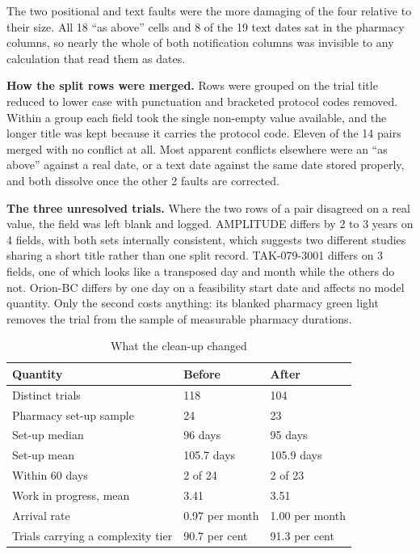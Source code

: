 The two positional and text faults were the more damaging of the four relative to their size. All 18 ``as above'' cells and 8 of the 19 text dates sat in the pharmacy columns, so nearly the whole of both notification columns was invisible to any calculation that read them as dates.

\textbf{How the split rows were merged.} Rows were grouped on the trial title reduced to lower case with punctuation and bracketed protocol codes removed. Within a group each field took the single non-empty value available, and the longer title was kept because it carries the protocol code. Eleven of the 14 pairs merged with no conflict at all. Most apparent conflicts elsewhere were an ``as above'' against a real date, or a text date against the same date stored properly, and both dissolve once the other 2 faults are corrected.

\textbf{The three unresolved trials.} Where the two rows of a pair disagreed on a real value, the field was left blank and logged. AMPLITUDE differs by 2 to 3 years on 4 fields, with both sets internally consistent, which suggests two different studies sharing a short title rather than one split record. TAK-079-3001 differs on 3 fields, one of which looks like a transposed day and month while the others do not. Orion-BC differs by one day on a feasibility start date and affects no model quantity. Only the second costs anything: its blanked pharmacy green light removes the trial from the sample of measurable pharmacy durations.

\begin{table}[htbp]
  \centering
  \caption{What the clean-up changed}
  \label{tab:cleanup}
  \begin{tabular}{@{}lll@{}}
    \toprule
    \textbf{Quantity} & \textbf{Before} & \textbf{After} \\
    \midrule
    Distinct trials & 118 & 104 \\
    Pharmacy set-up sample & 24 & 23 \\
    Set-up median & 96 days & 95 days \\
    Set-up mean & 105.7 days & 105.9 days \\
    Within 60 days & 2 of 24 & 2 of 23 \\
    Work in progress, mean & 3.41 & 3.51 \\
    Arrival rate & 0.97 per month & 1.00 per month \\
    Trials carrying a complexity tier & 90.7 per cent & 91.3 per cent \\
    \bottomrule
  \end{tabular}
\end{table}

